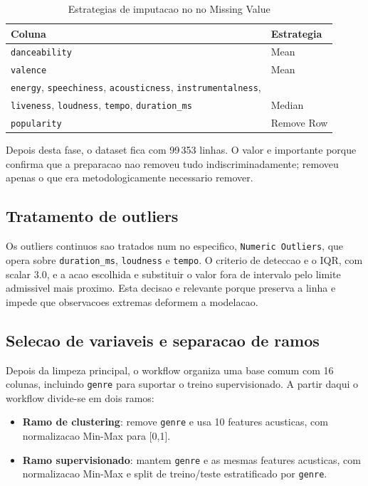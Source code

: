 \documentclass[11pt,a4paper]{article}
\begin{document}
\begin{table}[H]
\centering
\caption{Estrategias de imputacao no no Missing Value}
\begin{tabular}{p{4cm}p{8cm}}
\toprule
Coluna & Estrategia \\
\midrule
\texttt{danceability} & Mean \\
\texttt{valence} & Mean \\
\texttt{energy}, \texttt{speechiness}, \texttt{acousticness}, \texttt{instrumentalness}, \\
\texttt{liveness}, \texttt{loudness}, \texttt{tempo}, \texttt{duration\_ms} & Median \\
\texttt{popularity} & Remove Row \\
\bottomrule
\end{tabular}
\end{table}

Depois desta fase, o dataset fica com 99\,353 linhas. O valor e importante porque confirma que a preparacao nao removeu tudo indiscriminadamente; removeu apenas o que era metodologicamente necessario remover.

\subsection{Tratamento de outliers}
Os outliers continuos sao tratados num no especifico, \texttt{Numeric Outliers}, que opera sobre \texttt{duration\_ms}, \texttt{loudness} e \texttt{tempo}. O criterio de deteccao e o IQR, com scalar 3.0, e a acao escolhida e substituir o valor fora de intervalo pelo limite admissivel mais proximo. Esta decisao e relevante porque preserva a linha e impede que observacoes extremas deformem a modelacao.

\subsection{Selecao de variaveis e separacao de ramos}
Depois da limpeza principal, o workflow organiza uma base comum com 16 colunas, incluindo \texttt{genre} para suportar o treino supervisionado. A partir daqui o workflow divide-se em dois ramos:
\begin{itemize}[leftmargin=*]
    \item \textbf{Ramo de clustering}: remove \texttt{genre} e usa 10 features acusticas, com normalizacao Min-Max para [0,1].
    \item \textbf{Ramo supervisionado}: mantem \texttt{genre} e as mesmas features acusticas, com normalizacao Min-Max e split de treino/teste estratificado por \texttt{genre}.
\end{itemize}
\end{document}
